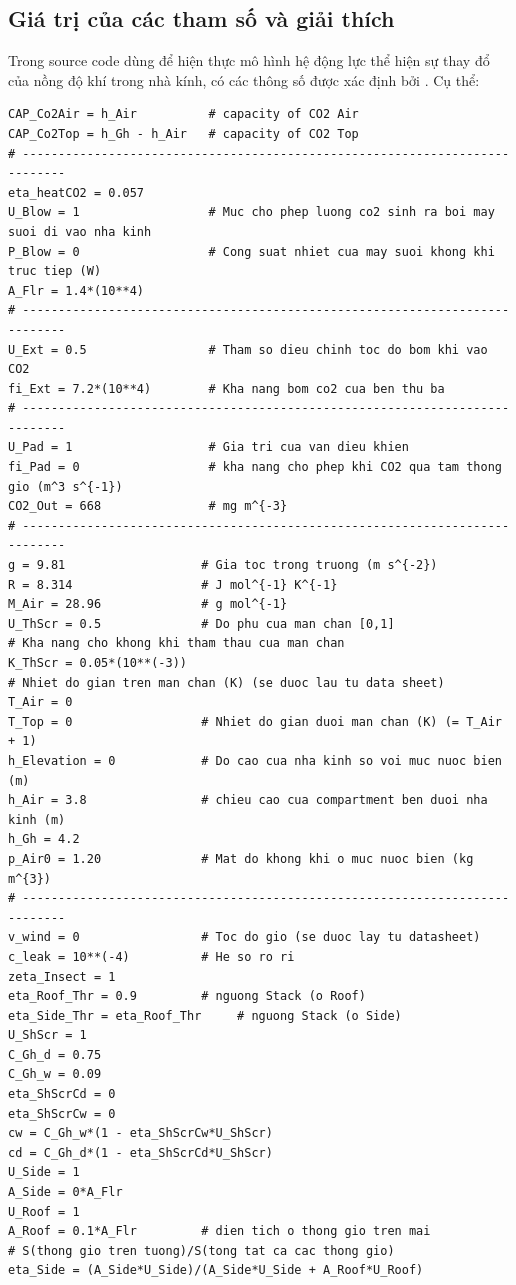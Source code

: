 \documentclass[13pt,a4paper]{article}
\begin{document}
		\subsection{Giá trị của các tham số và giải thích}
			Trong source code dùng để hiện thực mô hình hệ động lực thể hiện sự thay đổ của nồng độ khí  trong nhà kính, có các thông số được xác định bởi \cite{Van11}. Cụ thể:
\begin{lstlisting}
CAP_Co2Air = h_Air  		# capacity of CO2 Air
CAP_Co2Top = h_Gh - h_Air  	# capacity of CO2 Top
# ----------------------------------------------------------------------------
eta_heatCO2 = 0.057
U_Blow = 1    				# Muc cho phep luong co2 sinh ra boi may suoi di vao nha kinh
P_Blow = 0     				# Cong suat nhiet cua may suoi khong khi truc tiep (W)
A_Flr = 1.4*(10**4)
# ----------------------------------------------------------------------------
U_Ext = 0.5      			# Tham so dieu chinh toc do bom khi vao CO2
fi_Ext = 7.2*(10**4)     	# Kha nang bom co2 cua ben thu ba 
# ----------------------------------------------------------------------------
U_Pad = 1       			# Gia tri cua van dieu khien
fi_Pad = 0   				# kha nang cho phep khi CO2 qua tam thong gio (m^3 s^{-1})
CO2_Out = 668   			# mg m^{-3}
# ----------------------------------------------------------------------------
g = 9.81                   # Gia toc trong truong (m s^{-2})
R = 8.314            	   # J mol^{-1} K^{-1}
M_Air = 28.96			   # g mol^{-1}
U_ThScr = 0.5              # Do phu cua man chan [0,1]
# Kha nang cho khong khi tham thau cua man chan 
K_ThScr = 0.05*(10**(-3))
# Nhiet do gian tren man chan (K) (se duoc lau tu data sheet)
T_Air = 0
T_Top = 0	               # Nhiet do gian duoi man chan (K) (= T_Air + 1)
h_Elevation = 0		       # Do cao cua nha kinh so voi muc nuoc bien (m)
h_Air = 3.8         	   # chieu cao cua compartment ben duoi nha kinh (m)
h_Gh = 4.2
p_Air0 = 1.20   		   # Mat do khong khi o muc nuoc bien (kg m^{3})
# ----------------------------------------------------------------------------
v_wind = 0 				   # Toc do gio (se duoc lay tu datasheet)
c_leak = 10**(-4)   	   # He so ro ri
zeta_Insect = 1 	
eta_Roof_Thr = 0.9		   # nguong Stack (o Roof)
eta_Side_Thr = eta_Roof_Thr		# nguong Stack (o Side)
U_ShScr = 1
C_Gh_d = 0.75
C_Gh_w = 0.09
eta_ShScrCd = 0
eta_ShScrCw = 0
cw = C_Gh_w*(1 - eta_ShScrCw*U_ShScr)
cd = C_Gh_d*(1 - eta_ShScrCd*U_ShScr)
U_Side = 1
A_Side = 0*A_Flr
U_Roof = 1
A_Roof = 0.1*A_Flr         # dien tich o thong gio tren mai
# S(thong gio tren tuong)/S(tong tat ca cac thong gio)
eta_Side = (A_Side*U_Side)/(A_Side*U_Side + A_Roof*U_Roof)

\end{lstlisting}
\end{document}
